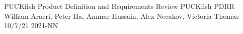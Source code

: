 \documentclass[12pt]{article}         %
\begin{document}
\buecedefinitions%
        {PUCKfish Product Definition and Requirements Review}
        {PUCKfish PDRR}
        {William Aracri, Peter Ha, Ammar Hussain, Alex Necakov, Victoria Thomas}
        {10/7/21}
        {2021-NN} %
        

\buecereporttitlepage


\tableofcontents
\vspace{50px}
\listoffigures
\listoftables\bueceemptypage

\buecereportheaders
\end{document}
